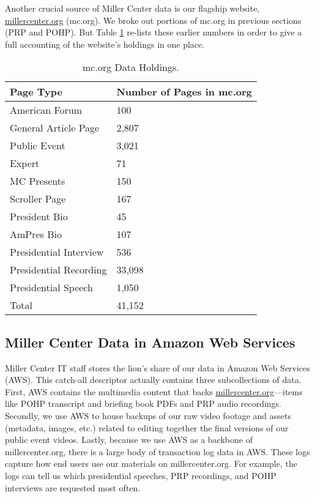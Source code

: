 \documentclass[12pt, oneside]{article}   	%
\begin{document}
Another crucial source of Miller Center data is our flagship website, \url{millercenter.org} (mc.org).  We broke out portions of mc.org in previous sections (PRP and POHP).  But Table \ref{table.data.mcorg} re-lists these earlier numbers in order to give a full accounting of the website's holdings in one place.


\begin{table}[htp]
\caption{mc.org Data Holdings.}
\begin{center}
\begin{tabular}{ p{1.75in} p{2in}}
\toprule
Page Type				&	Number of Pages in mc.org		\\
\midrule
American Forum			&	100		\\
\midrule
General Article Page			&	2,807	\\
\midrule
Public Event				&	3,021	\\
\midrule
Expert					&	71		\\
\midrule
MC Presents				&	150		\\
\midrule
Scroller Page				&	167		\\
\midrule
President Bio				&	45		\\
\midrule
AmPres Bio				&	107		\\
\midrule
Presidential Interview		&	536		\\
\midrule
Presidential Recording		&	33,098	\\
\midrule
Presidential Speech			&	1,050	\\
\bottomrule		
Total						& 	41,152	\\
\bottomrule
\end{tabular}
\end{center}
\label{table.data.mcorg}
\end{table}%



\subsection{Miller Center Data in Amazon Web Services}\label{section.data.aws}
Miller Center IT staff stores the lion’s share of our data in Amazon Web Services (AWS).  This catch-all descriptor actually contains three subcollections of data.  First, AWS contains the multimedia content that backs \url{millercenter.org}—items like POHP transcript and briefing book PDFs and PRP audio recordings.   Secondly, we use AWS to house backups of our raw video footage and assets (metadata, images, etc.) related to editing together the final versions of our public event videos.  Lastly, because we use AWS as a backbone of millercenter.org, there is a large body of transaction log data in AWS.  These logs capture how end users use our materials on millercenter.org.  For example, the logs can tell us which presidential speeches, PRP recordings, and POHP interviews are requested most often.
\end{document}
